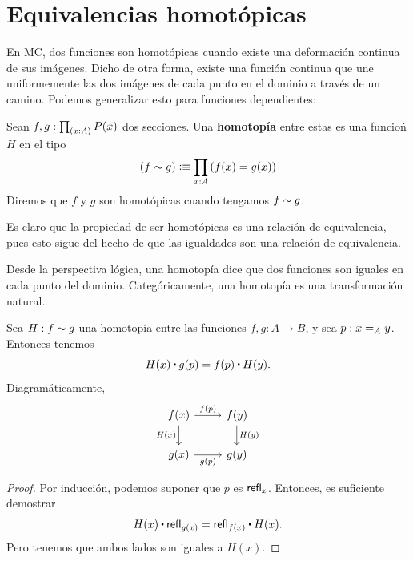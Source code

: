 \documentclass[../main.tex]{subfiles}
\begin{document}
\section{Equivalencias homot\'opicas}\label{sec-equivs}
En MC, dos funciones son homot\'opicas cuando existe una deformaci\'on continua de sus im\'agenes.
Dicho de otra forma, existe una función continua que une uniformemente las dos im\'agenes de cada punto en el dominio a trav\'es de un camino.
Podemos generalizar esto para funciones dependientes:

\begin{definition}
  Sean $f,g:\tprd{x:A}P(x)$ dos secciones. Una \textbf{homotop\'ia} entre estas es una funcio\'n $H$ en el tipo
  \[(f\htpy g) \defeq \prd{x:A}(f(x)=g(x))\]
  Diremos que $f$ y $g$ son homot\'opicas cuando tengamos $f\htpy g$.
\end{definition}

Es claro que la propiedad de ser homot\'opicas es una relaci\'on de equivalencia, pues esto sigue del hecho de que las igualdades son una relaci\'on de equivalencia.

Desde la perspectiva l\'ogica, una homotop\'ia dice que dos funciones son iguales en cada punto del dominio.
Categ\'oricamente, una homotopía es una transformación natural.


\begin{lemma}\label{htpy-nattrans}
  Sea $H:f\htpy g$ una homotop\'ia entre las funciones $f,g:A\to B$, y sea $p:\id[A]xy$.
  Entonces tenemos
  \begin{equation*}
    H(x)\ct\ap{g}{p}=\ap{f}{p}\ct H(y).
  \end{equation*}
  Diagram\'aticamente,
  \[\begin{tikzcd}
      {f(x)} & {f(y)} \\
      {g(x)} & {g(y)}
      \arrow["{H(y)}", from=1-2, to=2-2]
      \arrow["{g(p)}"', from=2-1, to=2-2]
      \arrow["{H(x)}"', from=1-1, to=2-1]
      \arrow["{f(p)}", from=1-1, to=1-2]
    \end{tikzcd}\]
\end{lemma}
\begin{proof}
  Por inducci\'on, podemos suponer que $p$ es $\refl x$.
  Entonces, es suficiente demostrar
  \[ H(x) \ct \refl{g(x)} = \refl{f(x)} \ct H(x). \]
  Pero tenemos que ambos lados son iguales a $H(x)$.
\end{proof}
\end{document}
